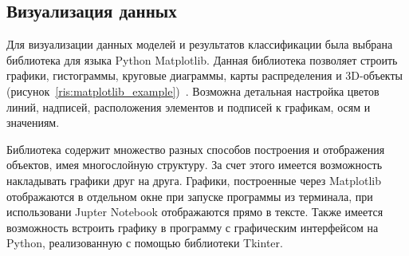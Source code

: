 \subsection{Визуализация данных}
Для визуализации данных моделей и результатов классификации была выбрана библиотека для языка Python Matplotlib. Данная библиотека позволяет строить графики, гистограммы, круговые диаграммы, карты распределения и 3D-объекты (рисунок~\ref{ris:matplotlib_example})~\cite{douson}. Возможна детальная настройка цветов линий, надписей, расположения элементов и подписей к графикам, осям и значениям.
\\
\par
Библиотека содержит множество разных способов построения и отображения объектов, имея многослойную структуру. За счет этого имеется возможность накладывать графики друг на друга. Графики, построенные через Matplotlib отображаются в отдельном окне при запуске программы из терминала, при использовани Jupter Notebook отображаются прямо в тексте. Также имеется возможность встроить графику в программу с графическим интерфейсом на Python, реализованную с помощью библиотеки Tkinter.
